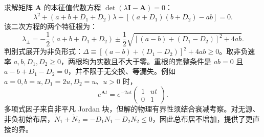 求解矩阵 $\mathbf{A}$ 的本征值代数方程 $\det(\lambda \mathbf{I} - \mathbf{A}) = 0$：
\begin{equation}\label{eq:appD-char-eq}
\lambda^2 + (a + b + D_1 + D_2) \lambda + \left[ (a + D_1)(b + D_2) - a b \right] = 0.
\end{equation}
该二次方程的两个特征根为：
\begin{equation}\label{eq:appD-eigenvalues-2state}
\lambda_\pm = -\frac{1}{2}(a + b + D_1 + D_2) \pm \frac{1}{2} \sqrt{[(a - b) + (D_1 - D_2)]^2 + 4 a b}.
\end{equation}
判别式展开为非负形式：$\Delta \equiv [(a - b) + (D_1 - D_2)]^2 + 4 a b \ge 0$。取非负速率 $a,b,D_1,D_2\ge0$，两根均为实数且不大于零。重根的完整条件是 $ab=0$ 且 $a-b+D_1-D_2=0$，并不限于无交换、等漏失。例如 $a=0,b=u,D_1=2u,D_2=u$、$u>0$ 时，
\[
e^{\mathbf At}=e^{-2ut}\begin{pmatrix}1&ut\\0&1\end{pmatrix}.
\]
多项式因子来自非平凡 Jordan 块，但解的物理有界性须结合衰减考察。对无源、非负初始布居，$\dot N_1+\dot N_2=-D_1N_1-D_2N_2\le0$，因此总布居不增加，提供了更直接的界。

